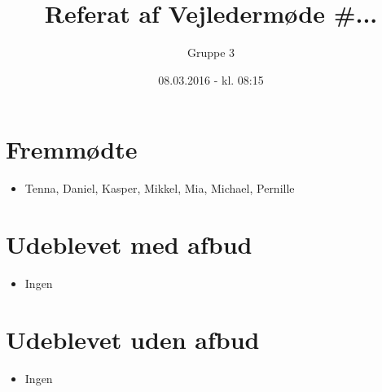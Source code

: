 \documentclass{article}
\title{Referat af Vejledermøde \#...}
\author{Gruppe 3}
\date{08.03.2016 - kl. 08:15}
\begin{document}
	\maketitle
	
	\section{Fremmødte}
	\begin{itemize}
		\item Tenna, Daniel, Kasper, Mikkel, Mia, Michael, Pernille 
	\end{itemize}

	
	\section{Udeblevet med afbud}
	\begin{itemize}
		\item Ingen
	\end{itemize}
	
	\section{Udeblevet uden afbud}
	\begin{itemize}
		\item Ingen 
	\end{itemize}
	
\end{document}

